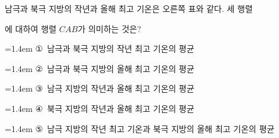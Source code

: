 \noindent\begin{minipage}[t]{0.58\linewidth}\vspace{0pt}\raggedright 남극과 북극 지방의 작년과 올해 최고 기온은 오른쪽 표와 같다. 세 행렬 \par\smallskip\end{minipage}\hfill\begin{minipage}[t]{0.4\linewidth}\vspace{0pt}\centering \resizebox{\ifdim\width>\linewidth\linewidth\else\width\fi}{!}{}\end{minipage}\par
\noindent {}\par\smallskip\noindent 에 대하여 행렬 $CAB$가 의미하는 것은?
\par\medskip\par\noindent\hangindent=1.4em {\small ①}\ 남극과 북극 지방의 작년 최고 기온의 평균\par\noindent\hangindent=1.4em {\small ②}\ 남극과 북극 지방의 올해 최고 기온의 평균\par\noindent\hangindent=1.4em {\small ③}\ 남극 지방의 작년과 올해 최고 기온의 평균\par\noindent\hangindent=1.4em {\small ④}\ 북극 지방의 작년과 올해 최고 기온의 평균\par\noindent\hangindent=1.4em {\small ⑤}\ 남극 지방의 작년 최고 기온과 북극 지방의 올해 최고 기온의 평균\par\medskip
